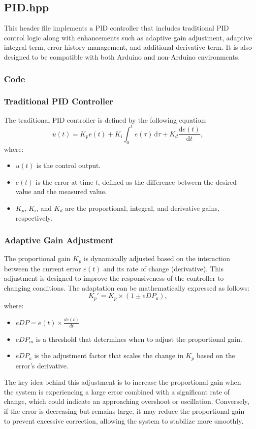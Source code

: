 \documentclass[a4paper,12pt]{article}
\begin{document}
\subsection{PID.hpp}
This header file implements a PID controller that includes traditional PID control logic along with enhancements such as adaptive gain adjustment, adaptive integral term, error history management, and additional derivative term. It is also designed to be compatible with both Arduino and non-Arduino environments.
\subsubsection{Code}

\subsubsection{Traditional PID Controller}
The traditional PID controller is defined by the following equation:
$$
u(t) = K_p e(t) + K_i \int_0^t e(\tau) \,\mathrm{d}\tau + K_d \frac{\mathrm{d}e(t)}{\mathrm{d}t},
$$
where:
\begin{itemize}
\item $u(t)$ is the control output.
\item $e(t)$ is the error at time $t$, defined as the difference between the desired value and the measured value.
\item $K_p$, $K_i$, and $K_d$ are the proportional, integral, and derivative gains, respectively.
\end{itemize}
\subsubsection{Adaptive Gain Adjustment}
The proportional gain $K_p$ is dynamically adjusted based on the interaction between the current error $e(t)$ and its rate of change (derivative). This adjustment is designed to improve the responsiveness of the controller to changing conditions. The adaptation can be mathematically expressed as follows:
$$
K_p' = K_p \times (1 \pm eDP_a),
$$
where:
\begin{itemize}
\item $eDP = e(t) \times \frac{de(t)}{dt}$
\item $eDP_m$ is a threshold that determines when to adjust the proportional gain.
\item $eDP_a$ is the adjustment factor that scales the change in $K_p$ based on the error’s derivative. 
\end{itemize}
The key idea behind this adjustment is to increase the proportional gain when the system is experiencing a large error combined with a significant rate of change, which could indicate an approaching overshoot or oscillation. Conversely, if the error is decreasing but remains large, it may reduce the proportional gain to prevent excessive correction, allowing the system to stabilize more smoothly.
\end{document}
